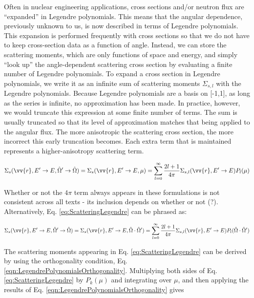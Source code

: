 \documentclass[10pt]{article}
\begin{document}
\begin{flushleft}
Often in nuclear engineering applications, cross sections and/or neutron flux are ``expanded'' in Legendre polynomials. This means that the angular dependence, previously unknown to us, is now described in terms of Legendre polynomials. This expansion is performed frequently with cross sections so that we do not have to keep cross-section data as a function of angle. Instead, we can store the scattering moments, which are only functions of space and energy, and simply ``look up'' the angle-dependent scattering cross section by evaluating a finite number of Legendre polynomials. To expand a cross section in Legendre polynomials, we write it as an infinite sum of scattering moments \(\Sigma_{s,l}\) with the Legendre polynomials. Because Legendre polynomials are a basis on [-1,1], as long as the series is infinite, no approximation has been made. In practice, however, we would truncate this expression at some finite number of terms. The sum is usually truncated so that its level of approximation matches that being applied to the angular flux. The more anisotropic the scattering cross section, the more incorrect this early truncation becomes. Each extra term that is maintained represents a higher-anisotropy scattering term.

\begin{equation}
\label{eq:ScatteringLegendre}
\Sigma_s(\vv{r}, E'\rightarrow E, \hat{\Omega}'\rightarrow\hat{\Omega}) = \Sigma_s(\vv{r}, E'\rightarrow E, \mu) = \sum_{l=0}^{\infty} \frac{2l+1}{4\pi} \Sigma_{s,l}(\vv{r}, E'\rightarrow E)P_l(\mu)
\end{equation}

Whether or not the \(4\pi\) term always appears in these formulations is not consistent across all texts - its inclusion depends on whether or not (?). Alternatively, Eq. \eqref{eq:ScatteringLegendre} can be phrased as:

\begin{equation}
\label{eq:ScatteringLegendre2}
\Sigma_s(\vv{r}, E'\rightarrow E, \hat{\Omega}'\rightarrow\hat{\Omega}) = \Sigma_s(\vv{r}, E'\rightarrow E, \hat{\Omega}\cdot\hat{\Omega}') = \sum_{l=0}^{\infty} \frac{2l+1}{4\pi} \Sigma_{s,l}(\vv{r}, E'\rightarrow E)P_l(\hat{\Omega}\cdot\hat{\Omega}')
\end{equation}

The scattering moments appearing in Eq. \ref{eq:ScatteringLegendre} can be derived by using the orthogonality condition, Eq. \ref{eqn:LegendrePolynomialsOrthogonality}. Multiplying both sides of Eq. \ref{eq:ScatteringLegendre} by \(P_k(\mu)\) and integrating over \(\mu\), and then applying the results of Eq. \ref{eqn:LegendrePolynomialsOrthogonality} gives


\end{flushleft}
\end{document}
